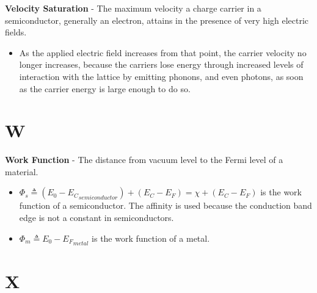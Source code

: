 \vspace{0.5cm}
\noindent
    \textbf{Velocity Saturation} - The maximum velocity a charge carrier in a semiconductor, generally an electron, attains in the presence of very high electric fields.
    \vspace{0.15cm}
    \begin{itemize}
        \setlength\itemsep{0.5em}
        \item{As the applied electric field increases from that point, the carrier velocity no longer increases, because the carriers lose energy through increased levels of interaction with the lattice by emitting phonons, and even photons, as soon as the carrier energy is large enough to do so.}
    \end{itemize}
\section{W}
    \textbf{Work Function} - The distance from vacuum level to the Fermi level of a material.
    \vspace{0.15cm}
    \begin{itemize}
        \setlength\itemsep{0.5em}
        \item{$\Phi_s \triangleq (E_0 - {E_C}_{semiconductor}) + (E_C - E_F) = \chi + (E_C - E_F)$ is the work function of a semiconductor.  The affinity is used because the conduction band edge is not a constant in semiconductors.}
        \item{$\Phi_m \triangleq E_0 - {E_F}_{metal}$ is the work function of a metal.}
    \end{itemize}
\section{X}
